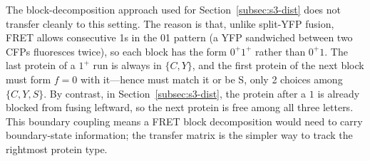 \documentclass[referee,lineno,pdflatex,sn-mathphys-ay]{sn-jnl}
\begin{document}
The block-decomposition approach used for Section~\ref{subsec:s3-dist} does not transfer cleanly to this setting. The reason is that, unlike split-YFP fusion, FRET allows consecutive 1s in the 01 pattern (a YFP sandwiched between two CFPs fluoresces twice), so each block has the form $0^+ 1^+$ rather than $0^+ 1$. The last protein of a $1^+$ run is always in $\{C, Y\}$, and the first protein of the next block must form $f = 0$ with it---hence must match it or be S, only 2 choices among $\{C, Y, S\}$. By contrast, in Section~\ref{subsec:s3-dist}, the protein after a $1$ is already blocked from fusing leftward, so the next protein is free among all three letters. This boundary coupling means a FRET block decomposition would need to carry boundary-state information; the transfer matrix is the simpler way to track the rightmost protein type.
\end{document}
